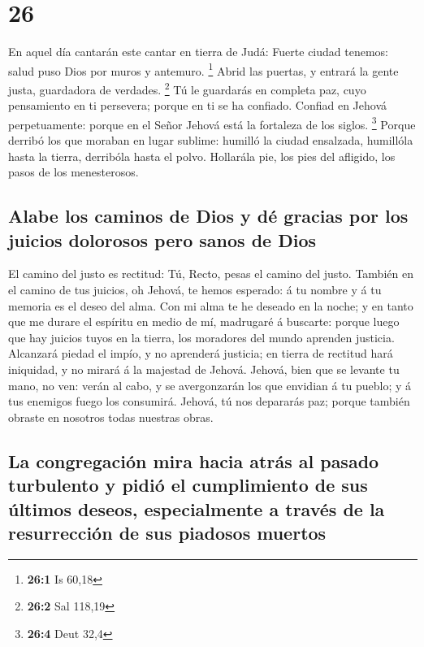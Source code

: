 \hypertarget{section-25}{%
\section{26}\label{section-25}}

 En aquel día cantarán este cantar en tierra de Judá:
Fuerte ciudad tenemos: salud puso Dios por muros y antemuro. \footnote{\textbf{26:1}
  Is 60,18}  Abrid las puertas, y entrará la gente justa,
guardadora de verdades. \footnote{\textbf{26:2} Sal 118,19}
 Tú le guardarás en completa paz, cuyo pensamiento en ti
persevera; porque en ti se ha confiado.  Confiad en Jehová
perpetuamente: porque en el Señor Jehová está la fortaleza de los
siglos. \footnote{\textbf{26:4} Deut 32,4}  Porque derribó
los que moraban en lugar sublime: humilló la ciudad ensalzada, humillóla
hasta la tierra, derribóla hasta el polvo.  Hollarála pie,
los pies del afligido, los pasos de los menesterosos.

\hypertarget{alabe-los-caminos-de-dios-y-duxe9-gracias-por-los-juicios-dolorosos-pero-sanos-de-dios}{%
\subsection{Alabe los caminos de Dios y dé gracias por los juicios
dolorosos pero sanos de
Dios}\label{alabe-los-caminos-de-dios-y-duxe9-gracias-por-los-juicios-dolorosos-pero-sanos-de-dios}}

 El camino del justo es rectitud: Tú, Recto, pesas el
camino del justo.  También en el camino de tus juicios, oh
Jehová, te hemos esperado: á tu nombre y á tu memoria es el deseo del
alma.  Con mi alma te he deseado en la noche; y en tanto
que me durare el espíritu en medio de mí, madrugaré á buscarte: porque
luego que hay juicios tuyos en la tierra, los moradores del mundo
aprenden justicia.  Alcanzará piedad el impío, y no
aprenderá justicia; en tierra de rectitud hará iniquidad, y no mirará á
la majestad de Jehová.  Jehová, bien que se levante tu
mano, no ven: verán al cabo, y se avergonzarán los que envidian á tu
pueblo; y á tus enemigos fuego los consumirá.  Jehová, tú
nos depararás paz; porque también obraste en nosotros todas nuestras
obras.

\hypertarget{la-congregaciuxf3n-mira-hacia-atruxe1s-al-pasado-turbulento-y-pidiuxf3-el-cumplimiento-de-sus-uxfaltimos-deseos-especialmente-a-travuxe9s-de-la-resurrecciuxf3n-de-sus-piadosos-muertos}{%
\subsection{La congregación mira hacia atrás al pasado turbulento y
pidió el cumplimiento de sus últimos deseos, especialmente a través de
la resurrección de sus piadosos
muertos}\label{la-congregaciuxf3n-mira-hacia-atruxe1s-al-pasado-turbulento-y-pidiuxf3-el-cumplimiento-de-sus-uxfaltimos-deseos-especialmente-a-travuxe9s-de-la-resurrecciuxf3n-de-sus-piadosos-muertos}}

